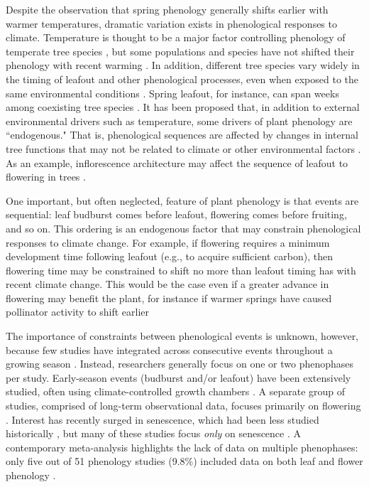 \documentclass{article}
\begin{document}
\par Despite the observation that spring phenology generally shifts earlier with warmer temperatures, dramatic variation exists in phenological responses to climate. Temperature is thought to be a major factor controlling phenology of temperate tree species \citep{parmesan2006,richardson2006,morin2010,schwartz2013,clark2014b}, but some populations and species have not shifted their phenology with recent warming \citep{wolkovich2012}. In addition, different tree species vary widely in the timing of leafout and other phenological processes, even when exposed to the same environmental conditions \citep{lechowicz1984,primack2009c}. Spring leafout, for instance, can span weeks among coexisting tree species \citep{lechowicz1984}. It has been proposed that, in addition to external environmental drivers such as temperature, some drivers of plant phenology are ``endogenous." That is, phenological sequences are affected by changes in internal tree functions that may not be related to climate or other environmental factors \citep{borchert1992,marco2002}. As an example, inflorescence architecture may affect the sequence of leafout to flowering in trees \citep{marco2002}. 

\par One important, but often neglected, feature of plant phenology is that events are sequential: leaf budburst comes before leafout, flowering comes before fruiting, and so on. This ordering is an endogenous factor that may constrain phenological responses to climate change. For example, if flowering requires a minimum development time following leafout (e.g., to acquire sufficient carbon), then flowering time may be constrained to shift no more than leafout timing has with recent climate change. This would be the case even if a greater advance in flowering may benefit the plant, for instance if warmer springs have caused pollinator activity to shift earlier \citep{polgar2013, thackeray2010}

\par The importance of constraints between phenological events is unknown, however, because few studies have integrated across consecutive events throughout a growing season \citep{wolkovich2014}. Instead, researchers generally focus on one or two phenophases per study. Early-season events (budburst and/or leafout) have been extensively studied, often using climate-controlled growth chambers \citep[e.g.,][]{basler2012,laube2014}. A separate group of studies, comprised of long-term observational data, focuses primarily on flowering \citep[e.g.,] []{fitter2002,millerrushing2008}. Interest has recently surged in senescence, which had been less studied historically \citep {parmesan2006}, but many of these studies focus \textit{only} on senescence \citep[e.g.,][]{taylor2008,archetti2013,jeong2014}. A contemporary meta-analysis highlights the lack of data on multiple phenophases: only five out of 51 phenology studies (9.8\%) included data on both leaf and flower phenology \citep{wolkovich2012}. 
\end{document}
